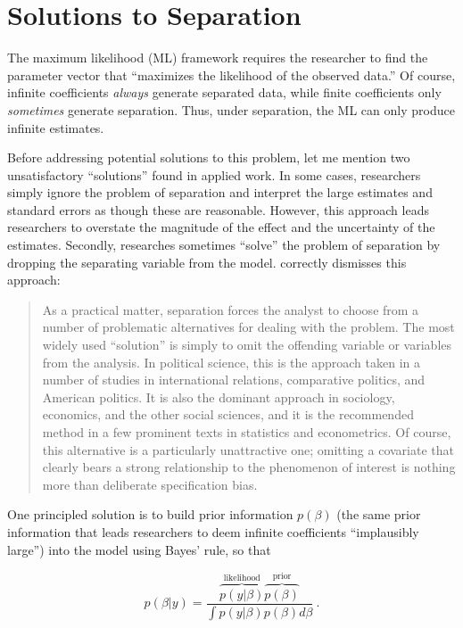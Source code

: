 \documentclass[12pt]{article}
\begin{document}
\section*{Solutions to Separation}

The maximum likelihood (ML) framework requires the researcher to find the parameter vector that ``maximizes the likelihood of the observed data.'' Of course, infinite coefficients \textit{always} generate separated data, while finite coefficients only \emph{sometimes} generate separation. Thus, under separation, the ML can only produce infinite estimates.

Before addressing potential solutions to this problem, let me mention two unsatisfactory ``solutions'' found in applied work. In some cases, researchers simply ignore the problem of separation and interpret the large estimates and standard errors as though these are reasonable. However, this approach leads researchers to overstate the magnitude of the effect and the uncertainty of the estimates. Secondly, researches sometimes ``solve'' the problem of separation by dropping the separating variable from the model. \citet[pp. 161-162]{Zorn2005} correctly dismisses this approach:

\begin{quote}
As a practical matter, separation forces the analyst to choose from a number of problematic alternatives for dealing with the problem. The most widely used ``solution'' is simply to omit the offending variable or variables from the analysis. In political science, this is the approach taken in a number of studies in international relations, comparative politics, and American politics. It is also the dominant approach in sociology, economics, and the other social sciences, and it is the recommended method in a few prominent texts in statistics and econometrics. Of course, this alternative is a particularly unattractive one; omitting a covariate that clearly bears a strong relationship to the phenomenon of interest is nothing more than deliberate specification bias.
\end{quote}

One principled solution is to build prior information $p(\beta)$ (the same prior information that leads researchers to deem infinite coefficients ``implausibly large'') into the model using Bayes' rule, so that 

\begin{equation}\nonumber
p(\beta|y) = \dfrac{\overbrace{p(y|\beta)}^{\text{likelihood}}\overbrace{p(\beta)}^{\text{prior}}}{\int p(y|\beta)p(\beta) d\beta}~\text{.}
\end{equation}
\end{document}
